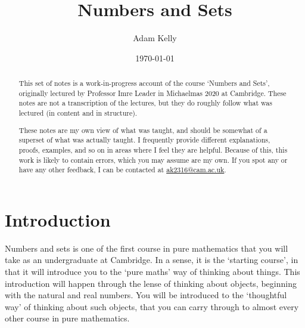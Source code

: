 \documentclass[a4paper]{scrreprt}
\title{Numbers and Sets}
\author{Adam Kelly}
\date{\today}
\begin{document}
\maketitle

\begin{abstract}
	

	This set of notes is a work-in-progress account of the course `Numbers and Sets', originally lectured by Professor Imre Leader in Michaelmas 2020 at Cambridge. These notes are not a transcription of the lectures, but they do roughly follow what was lectured (in content and in structure).

	These notes are my own view of what was taught, and should be somewhat of a superset of what was actually taught. I frequently provide different explanations, proofs, examples, and so on in areas where I feel they are helpful. Because of this, this work is likely to contain errors, which you may assume are my own. If you spot any or have any other feedback, I can be contacted at \href{mailto:ak2316@cam.ac.uk}{ak2316@cam.ac.uk}.


\end{abstract}

\tableofcontents

\clearpage
\chapter{Introduction}

Numbers and sets is one of the first course in pure mathematics that you will take
as an undergraduate at Cambridge. In a sense, it is the `starting course', in that it will introduce you to the `pure maths' way of thinking about things. 
This introduction will happen through the lense of thinking about objects, beginning with the natural and real numbers. You will be introduced to the `thoughtful way' of thinking about such objects, that you can carry through to almost every other course in pure mathematics.
\end{document}
